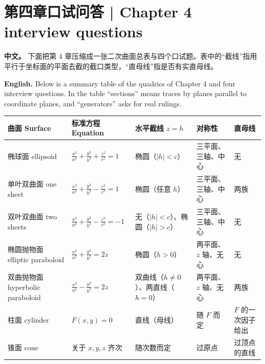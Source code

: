 \documentclass[UTF8,11pt,a4paper]{ctexart}
\newcommand{\APS}[2]{\par\noindent\textbf{中文。} #1\par\noindent\textbf{English.} #2\par\smallskip}
\theoremstyle{definition}
\begin{document}
\section{\label{sec:8}第四章口试问答 | Chapter 4 interview questions}
\APS{下面把第 4 章压缩成一张二次曲面总表与四个口试题。表中的``截线''指用平行于坐标面的平面去截的截口类型，``直母线''指是否有实直母线。}{Below is a summary table of the quadrics of Chapter 4 and four interview questions. In the table ``sections'' means traces by planes parallel to coordinate planes, and ``generators'' asks for real rulings.}

\begin{center}\small
\begin{tabular}{@{}>{\raggedright\arraybackslash}p{2.6cm}>{\raggedright\arraybackslash}p{3.7cm}>{\raggedright\arraybackslash}p{3.2cm}>{\raggedright\arraybackslash}p{2.2cm}>{\raggedright\arraybackslash}p{2.5cm}@{}}
\toprule
曲面 Surface & 标准方程 Equation & 水平截线 $z=h$ & 对称性 & 直母线 \\
\midrule
椭球面 ellipsoid & $\frac{x^2}{a^2}+\frac{y^2}{b^2}+\frac{z^2}{c^2}=1$ & 椭圆（$|h|<c$） & 三平面、三轴、中心 & 无 \\
单叶双曲面 one sheet & $\frac{x^2}{a^2}+\frac{y^2}{b^2}-\frac{z^2}{c^2}=1$ & 椭圆（任意 $h$） & 三平面、三轴、中心 & 两族 \\
双叶双曲面 two sheets & $\frac{x^2}{a^2}+\frac{y^2}{b^2}-\frac{z^2}{c^2}=-1$ & 无（$|h|<c$）、椭圆（$|h|>c$） & 三平面、三轴、中心 & 无 \\
椭圆抛物面 elliptic paraboloid & $\frac{x^2}{a^2}+\frac{y^2}{b^2}=2z$ & 椭圆（$h>0$） & 两平面、$z$ 轴、无心 & 无 \\
双曲抛物面 hyperbolic paraboloid & $\frac{x^2}{a^2}-\frac{y^2}{b^2}=2z$ & 双曲线（$h\ne0$）、两直线（$h=0$） & 两平面、$z$ 轴、无心 & 两族 \\
柱面 cylinder & $F(x,y)=0$ & 直线（母线） & 随 $F$ 而定 & $F$ 的一次因子给出 \\
锥面 cone & 关于 $x,y,z$ 齐次 & 随次数而定 & 过原点 & 过顶点的直线 \\
\bottomrule
\end{tabular}
\end{center}
\end{document}
